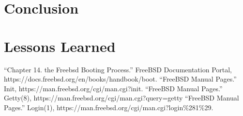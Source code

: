\documentclass[12pt, dvipsnames, a4paper]{article}
\begin{document}
\section{Conclusion}
\lipsum[1]

\section{Lessons Learned}
\lipsum[1]

\begin{thebibliography}{00}
	 “Chapter 14. the Freebsd Booting Process.” FreeBSD Documentation Portal,
	https://docs.freebsd.org/en/books/handbook/boot.
	 “FreeBSD Manual Pages.” Init, https://man.freebsd.org/cgi/man.cgi?init.
	 “FreeBSD Manual Pages.” Getty(8), https://man.freebsd.org/cgi/man.cgi?query=getty
	 “FreeBSD Manual Pages.” Login(1), https://man.freebsd.org/cgi/man.cgi?login\%281\%29.
\end{thebibliography}
\end{document}
